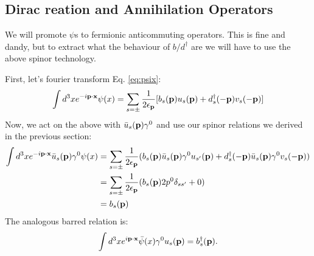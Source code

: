 \subsection{Dirac reation and Annihilation Operators}
We will promote $\psi$s to fermionic anticommuting operators. This is fine and dandy, but to extract what the behaviour of $b/d^\dag$ are we will have to use the above spinor technology.

First, let's fourier transform Eq. \eqref{eq:psix}:
\begin{equation}
    \int d^3x e^{-i\mathbf{p}\cdot\mathbf{x}}\psi(x) = \sum_{s=\pm}\frac{1}{2\epsilon_{\mathbf{p}}}[b_s(\mathbf{p})u_s(\mathbf{p}) + d^\dagger_s(-\mathbf{p})v_s(-\mathbf{p})]
\end{equation}
Now, we act on the above with $\bar{u}_s(\mathbf{p})\gamma^0$ and use our spinor relations we derived in the previous section:
\begin{equation}
    \begin{split}
        \int d^3xe^{-i\mathbf{p}\cdot\mathbf{x}}\bar{u}_s(\mathbf{p})\gamma^0\psi(x) &= \sum_{s=\pm}\frac{1}{2\epsilon_{\mathbf{p}}}(b_s(\mathbf{p})\bar{u}_s(\mathbf{p})\gamma^0u_{s'}(\mathbf{p}) + d^\dagger_s(-\mathbf{p})\bar{u}_s(\mathbf{p})\gamma^0v_s(-\mathbf{p}))
        \\ &= \sum_{s=\pm}\frac{1}{2\epsilon_{\mathbf{p}}}(b_s(\mathbf{p})2p^0\delta_{ss'} + 0)
        \\ &= b_s(\mathbf{p})
    \end{split}
\end{equation}
The analogous barred relation is:
\begin{equation}
    \int d^3x e^{i\mathbf{p}\cdot\mathbf{x}}\bar{\psi}(x)\gamma^0u_s(\mathbf{p}) = b_s^\dagger(\mathbf{p}).
\end{equation}


